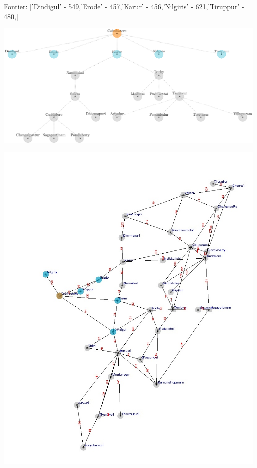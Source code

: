 \documentclass[xcolor=table]{beamer}
\begin{document}
\begin{frame}
  { \tiny Fontier: ['Dindigul' - 549,'Erode' - 457,'Karur' - 456,'Nilgiris' - 621,'Tiruppur' - 480,] }
  \begin{center}
  \includegraphics[height=0.35\textheight]{../AStarNode/3-1.png}
  \end{center}
  \begin{center}
    \includegraphics[height=0.55\textheight]{../AStaroutput/tamilAStar1.jpg}
  \end{center}
\end{frame}
\end{document}
